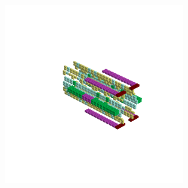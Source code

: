 \begin{minipage}[b]{0.50\linewidth}
\begin{figure}[H]
        \vspace*{-8cm}
        \hspace*{2cm}
        \includegraphics[width=8cm]{src/symmetries/pattern13_4-45.png}
        \vspace*{-2.5cm}
  \caption*{}
  \end{figure}
\end{minipage}

